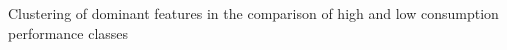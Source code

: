 Clustering of dominant features in the comparison of high and low consumption performance classes
\label{fig:featurecluserting_performanceclass}